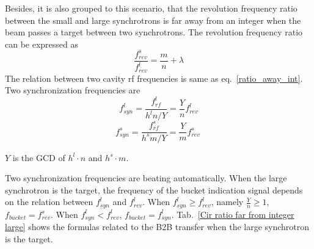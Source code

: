 %
%




Besides, it is also grouped to this scenario, that the revolution frequency ratio between the small and large synchrotrons is far away from an integer when the beam passes a target between two synchrotrons. The revolution frequency ratio can be expressed as
\begin{equation} 
\frac{f_{\mathit{rev}}^{s}}{f_{\mathit{rev}}^{l}}=\frac{m}{n}+ \lambda\label{close_to_interger2}
\end{equation}
The relation between two cavity rf frequencies is same as eq.~\ref{ratio_away_int}. Two synchronization frequencies are
\begin{equation}
f_{\mathit{syn}}^{l}=\frac{f_{\mathit{rf}}^{l}}{h^{l}n/Y}=\frac{Y}{n}f_{\mathit{rev}}^{l} \label{synch_freq111_r}
\end{equation}
\begin{equation}
f_{\mathit{syn}}^{s}=\frac{f_{\mathit{rf}}^{s}}{h^{s}m/Y}=\frac{Y}{m}f_{\mathit{rev}}^{s} \ \label{synch_freq222_r}
\end{equation}

$Y$ is the GCD of $h^l\cdot n$ and $h^s \cdot m$.

Two synchronization frequencies are beating automatically. When the large synchrotron is the target, the frequency of the bucket indication signal depends on the relation between $f_{\mathit{syn}}^{l}$ and $f_{\mathit{rev}}^{l}$. When $f_{\mathit{syn}}^{l}\ge f_{\mathit{rev}}^{l}$, namely $\frac{Y}{n}\ge1$, $f_\mathit{bucket}=f_{\mathit{rev}}^{s}$. When $f_{\mathit{syn}}^{l}< f_{\mathit{rev}}^{l}$, $f_\mathit{bucket}=f_{\mathit{syn}}^{l}$. Tab.~\ref{Cir ratio far from integer large} shows the formulas related to the B2B transfer when the large synchrotron is the target.

